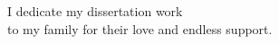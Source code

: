 
\begin{dedication} %

I dedicate my dissertation work \\to my family for their love and endless support. \\

\end{dedication}

